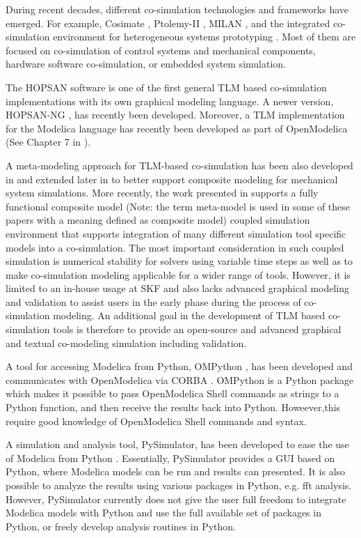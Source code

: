 During recent decades, different co-simulation technologies and frameworks have emerged.  For example, Cosimate \cite{tnisoftware}, Ptolemy-II \cite{cosimulationptolemy}, MILAN \cite{cosimulationmilan}, and the integrated co-simulation environment for heterogeneous systems prototyping \cite{cosimulationyongjoo}. Most of them are focused on co-simulation of control systems and mechanical components, hardware software co-simulation, or embedded system simulation. 

The HOPSAN \cite{hopsanusersguide} software is one of the first general TLM based co-simulation implementations with its own graphical modeling language. A newer version, HOPSAN-NG \cite{hospanaxin}, has recently been developed. Moreover, a TLM implementation for the Modelica language has recently been developed as part of OpenModelica (See Chapter 7 in \cite{tlmmartin}).

A meta-modeling approach for TLM-based co-simulation has been also developed in \cite{tlmalexander05} and extended later in \cite{tlmsiemers06,tlmsiemers07} to better support composite modeling for mechanical system simulations. More recently, the work presented in \cite{tlmsiemers09} supports a fully functional composite model (Note: the term meta-model is used in some of these papers with a meaning defined as composite model) coupled simulation environment that supports integration of many different simulation tool specific models into a co-simulation. The most important consideration in such coupled simulation is numerical stability for solvers using variable time steps as well as to make co-simulation modeling applicable for a wider range of tools. However, it is limited to an in-house usage at SKF and also lacks advanced graphical modeling and validation to assist users in the early phase during the process of co- simulation modeling. An additional goal in the development of TLM based co-simulation tools is therefore to provide an open-source and advanced graphical and textual co-modeling simulation including validation.

A tool for accessing Modelica from Python, OMPython \cite{ompythonanandthesis}, has been developed and communicates with OpenModelica via CORBA .  OMPython is a Python package which makes it possible to pass OpenModelica Shell commands as strings to a Python function, and then receive the results back into Python. Howeever,this require good knowledge of OpenModelica Shell commands and syntax. 

A simulation and analysis tool, PySimulator, has been developed to ease the use of Modelica from Python \cite{pysimulator}. Essentially, PySimulator provides a GUI based on Python, where Modelica models can be run and results can presented. It is also possible to analyze the results using various packages in Python, e.g. \acrshort{fft} analysis. However, PySimulator currently does not give the user full freedom to integrate Modelica models with Python and use the full available set of packages in Python, or freely develop analysis routines in Python.

